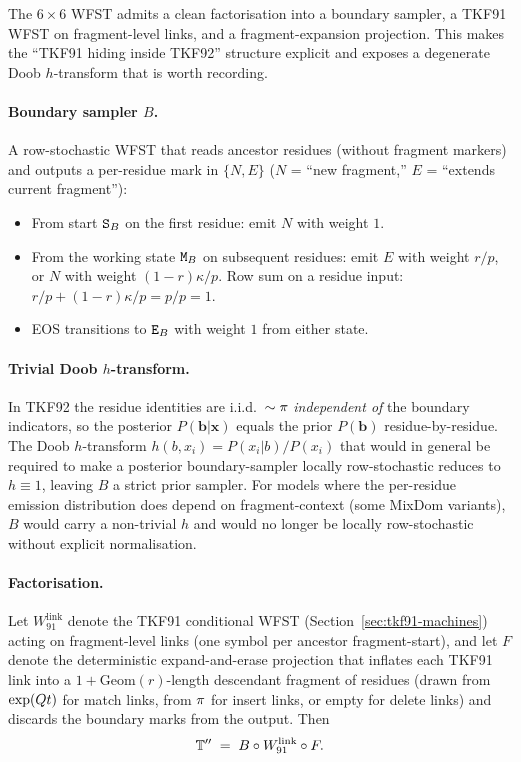The $6{\times}6$ WFST admits a clean factorisation into a boundary
sampler, a TKF91 WFST on fragment-level links, and a fragment-expansion
projection.  This makes the ``TKF91 hiding inside TKF92'' structure
explicit and exposes a degenerate Doob $h$-transform that is worth
recording.

\paragraph{Boundary sampler $B$.}  A row-stochastic WFST that reads
ancestor residues (without fragment markers) and outputs a per-residue
mark in $\{N, E\}$ ($N$ = ``new fragment,'' $E$ = ``extends current
fragment''):
\begin{itemize}[nosep]
\item From start ${\tt S}_B$ on the first residue: emit $N$ with weight $1$.
\item From the working state ${\tt M}_B$ on subsequent residues: emit $E$ with
  weight $r/p$, or $N$ with weight $(1-r)\kappa/p$.  Row sum on a
  residue input: $r/p + (1-r)\kappa/p = p/p = 1$.
\item EOS transitions to ${\tt E}_B$ with weight $1$ from either state.
\end{itemize}

\paragraph{Trivial Doob $h$-transform.}  In TKF92 the residue identities
are i.i.d.\ $\sim \pi$ {\em independent of\/} the boundary indicators,
so the posterior $P(\mathbf{b}|\mathbf{x})$ equals the prior
$P(\mathbf{b})$ residue-by-residue.  The Doob $h$-transform $h(b,x_i)
= P(x_i|b)/P(x_i)$ that would in general be required to make a
posterior boundary-sampler locally row-stochastic reduces to
$h \equiv 1$, leaving $B$ a strict prior sampler.  For models where
the per-residue emission distribution does depend on fragment-context
(some MixDom variants), $B$ would carry a non-trivial $h$ and would
no longer be locally row-stochastic without explicit normalisation.

\paragraph{Factorisation.}  Let $W_{91}^{\text{link}}$ denote the
TKF91 conditional WFST (Section~\ref{sec:tkf91-machines}) acting on
fragment-level links (one symbol per ancestor fragment-start), and
let $F$ denote the deterministic expand-and-erase projection that
inflates each TKF91 link into a $1{+}\text{Geom}(r)$-length
descendant fragment of residues (drawn from $\exp(Qt)$ for
match links, from $\pi$ for insert links, or empty for delete links)
and discards the boundary marks from the output.  Then
\[
\mathbb{T}'' \;=\; B \circ W_{91}^{\text{link}} \circ F .
\]

